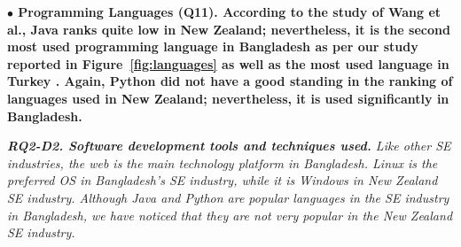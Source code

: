 \nd\bf{$\bullet$ Programming Languages (Q11).} According to the study of Wang et
al.\citep{Wang2018}, Java ranks quite low in New Zealand; nevertheless, it is
the second most used programming language in Bangladesh as per our study
reported in Figure~\ref{fig:languages} as well as the most used language in
Turkey \citep{Garousi2015}. Again, Python did not have a good standing in the
ranking of languages used in New Zealand; nevertheless, it is used significantly
in Bangladesh.

\begin{tcolorbox}[flushleft upper,boxrule=1pt,arc=0pt,left=0pt,right=0pt,top=0pt,bottom=0pt,colback=white,after=\ignorespacesafterend\par\noindent]
\nd\it{\bf{RQ2-D2. Software development tools and techniques used.}}
Like other SE industries, the web is the main technology platform in Bangladesh. Linux is the preferred OS in Bangladesh's SE industry, while it is  Windows in  New Zealand SE industry. Although Java and Python are popular languages in the SE industry in Bangladesh, we have noticed that they are not very popular in the New Zealand SE industry.
\end{tcolorbox}